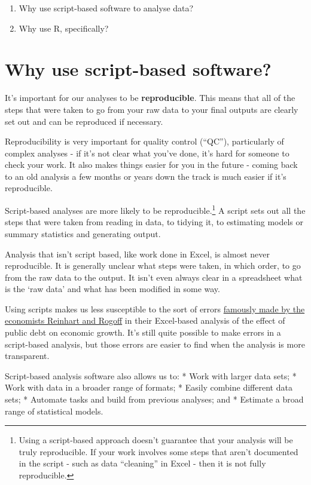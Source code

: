 \documentclass[]{book}
\providecommand{\tightlist}{%
  \setlength{\itemsep}{0pt}\setlength{\parskip}{0pt}}
\let\rmarkdownfootnote\footnote%
\def\footnote{\protect\rmarkdownfootnote}
\begin{document}
\begin{enumerate}
\def\labelenumi{\arabic{enumi}.}
\tightlist
\item
  Why use script-based software to analyse data?
\item
  Why use R, specifically?
\end{enumerate}

\hypertarget{why-script}{%
\section{Why use script-based software?}\label{why-script}}

It's important for our analyses to be \textbf{reproducible}. This means that all of the steps that were taken to go from your raw data to your final outputs are clearly set out and can be reproduced if necessary.

Reproducibility is very important for quality control (``QC''), particularly of complex analyses - if it's not clear what you've done, it's hard for someone to check your work. It also makes things easier for you in the future - coming back to an old analysis a few months or years down the track is much easier if it's reproducible.

Script-based analyses are more likely to be reproducible.\footnote{Using a script-based approach doesn't guarantee that your analysis will be truly reproducible. If your work involves some steps that aren't documented in the script - such as data ``cleaning'' in Excel - then it is not fully reproducible.} A script sets out all the steps that were taken from reading in data, to tidying it, to estimating models or summary statistics and generating output.

Analysis that isn't script based, like work done in Excel, is almost never reproducible. It is generally unclear what steps were taken, in which order, to go from the raw data to the output. It isn't even always clear in a spreadsheet what is the `raw data' and what has been modified in some way.

Using scripts makes us less susceptible to the sort of errors \href{https://en.wikipedia.org/wiki/Growth_in_a_Time_of_Debt\#Methodological_flaws}{famously made by the economists Reinhart and Rogoff} in their Excel-based analysis of the effect of public debt on economic growth. It's still quite possible to make errors in a script-based analysis, but those errors are easier to find when the analysis is more transparent.

Script-based analysis software also allows us to:
* Work with larger data sets;
* Work with data in a broader range of formats;
* Easily combine different data sets;
* Automate tasks and build from previous analyses; and
* Estimate a broad range of statistical models.
\end{document}
